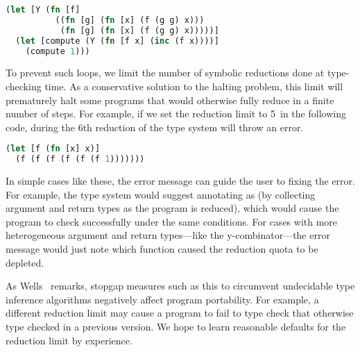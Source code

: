 \begin{lstlisting}[language=Clojure]
(let [Y (fn [f]
          ((fn [g] (fn [x] (f (g g) x)))
           (fn [g] (fn [x] (f (g g) x)))))]
  (let [compute (Y (fn [f x] (inc (f x))))]
    (compute 1)))
\end{lstlisting}

To prevent such loops, we limit the number of symbolic reductions
done at type-checking time.
As a conservative solution to the halting
problem, this limit will prematurely halt some programs that would
otherwise fully reduce in a finite number of steps.
For example, if we set the reduction limit to 5\ in
the following code,
during the 6th reduction of  the type system will
throw an error.

\begin{lstlisting}[language=Clojure]
(let [f (fn [x] x)]
  (f (f (f (f (f (f 1)))))))
\end{lstlisting}

In simple cases like these, the error message 
can guide the user to fixing the error.
For example, the type system would suggest 
annotating  as  (by collecting
argument and return types as the program is reduced),
which would cause the program to check successfully
under the same conditions.
For cases with more heterogeneous argument and return types---like the y-combinator---the 
error message would just note which function caused
the reduction quota to be depleted.

As Wells~\cite{wells1994typability} remarks,
stopgap measures such as this to circumvent undecidable
type inference algorithms negatively affect
program portability.
For example, a different reduction limit may cause
a program to fail to type check that otherwise type checked
in a previous version.
We hope to learn reasonable defaults for the reduction limit
by experience.


